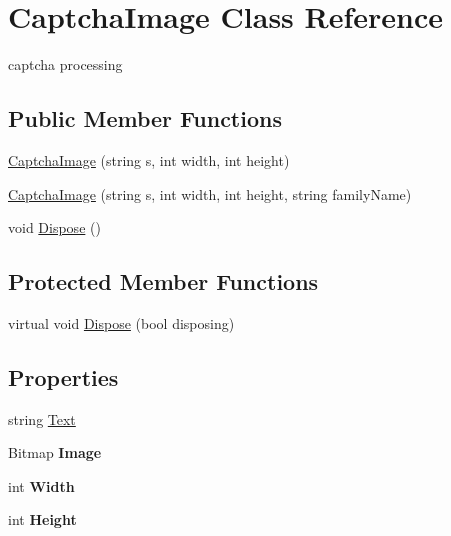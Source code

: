 \hypertarget{class_captcha_image}{\section{Captcha\-Image Class Reference}
\label{class_captcha_image}
}


captcha processing  


\subsection*{Public Member Functions}
\begin{DoxyCompactItemize}
\item 
\hyperlink{class_captcha_image_addc88187074e1bc48f760181fe5346f6}{Captcha\-Image} (string s, int width, int height)
\item 
\hyperlink{class_captcha_image_adae3bb23f62acfffa6097cc94b35cbb8}{Captcha\-Image} (string s, int width, int height, string family\-Name)
\item 
void \hyperlink{class_captcha_image_ab19b4ea2bea72f095c1c009769cfe869}{Dispose} ()
\end{DoxyCompactItemize}
\subsection*{Protected Member Functions}
\begin{DoxyCompactItemize}
\item 
virtual void \hyperlink{class_captcha_image_a4fc7337f8a9fb18df976d23f65d6fa2a}{Dispose} (bool disposing)
\end{DoxyCompactItemize}
\subsection*{Properties}
\begin{DoxyCompactItemize}
\item 
string \hyperlink{class_captcha_image_a63d4fc8c2e707cbb26bb93a249032dc0}{Text}
\item 
\hypertarget{class_captcha_image_af2c3c82cbfda08435a090f8e577afb58}{Bitmap {\bfseries Image}}\label{class_captcha_image_af2c3c82cbfda08435a090f8e577afb58}

\item 
\hypertarget{class_captcha_image_a2e00afe7b142e38eb93504ef44b02b9a}{int {\bfseries Width}}\label{class_captcha_image_a2e00afe7b142e38eb93504ef44b02b9a}

\item 
\hypertarget{class_captcha_image_a9ec050533e325e884f0e9c62dbe82f2d}{int {\bfseries Height}}\label{class_captcha_image_a9ec050533e325e884f0e9c62dbe82f2d}

\end{DoxyCompactItemize}


